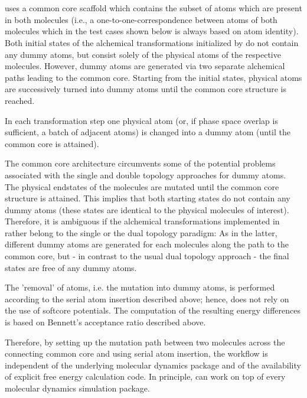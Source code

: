 \chapter{{\trafo} }

{\trafo} uses a common core scaffold which contains the subset of atoms which are present in both molecules (i.e., a one-to-one-correspondence between
atoms of both molecules which in the test cases shown below is always
based on atom identity). Both initial states of the alchemical transformations initialized by {\trafo} do not contain any dummy atoms, but consist solely of the physical atoms of the respective molecules. However, dummy atoms are generated via two separate alchemical paths leading to the common core. Starting from the initial states, physical atoms are successively turned into dummy atoms until the common core structure is reached. 

In each transformation step one physical atom (or, if phase space
overlap is sufficient, a batch of adjacent atoms) is changed into
a dummy atom (until the common core is attained).

The common core architecture circumvents some of the potential problems
associated with the single and double topology approaches for dummy
atoms. The physical endstates of the molecules are mutated until the
common core structure is attained. This implies that both starting states
do not contain any dummy atoms (these states are identical to the
physical molecules of interest). Therefore, it is ambiguous if the
alchemical transformations implemented in {\trafo} rather belong
to the single or the dual topology paradigm: As in the latter, different
dummy atoms are generated for each molecules along the path to the
common core, but - in contrast to the usual dual topology approach
- the final states are free of any dummy atoms. 

The 'removal' of atoms, i.e. the mutation into dummy atoms, is performed
according to the serial atom insertion described above; hence, {\trafo}
does not rely on the use of softcore potentials. The computation
of the resulting energy differences is based on Bennett's acceptance
ratio described above.

Therefore, by setting up the mutation path between two molecules across
the connecting common core and using serial atom
insertion, the {\trafo} workflow is independent of the underlying
molecular dynamics package and of the availability of explicit free energy
calculation code. In principle, {\trafo} can work on top of every
molecular dynamics simulation package.

